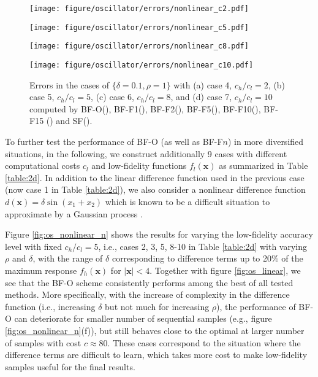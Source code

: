 \documentclass[11pt]{article}
\begin{document}
\begin{figure}
\centering
\begin{minipage}[b]{0.48\linewidth}
\texttt{[image: figure/oscillator/errors/nonlinear\_c2.pdf]}
\end{minipage}
\begin{minipage}[b]{0.48\linewidth}
\texttt{[image: figure/oscillator/errors/nonlinear\_c5.pdf]}
\end{minipage}
\begin{minipage}[b]{0.48\linewidth}
\texttt{[image: figure/oscillator/errors/nonlinear\_c8.pdf]}
\end{minipage}
\begin{minipage}[b]{0.48\linewidth}
\texttt{[image: figure/oscillator/errors/nonlinear\_c10.pdf]}
\end{minipage}
\caption{Errors in the cases of $\{\delta=0.1, \rho=1\}$ with (a) case 4, $c_h/c_l=2$, (b) case 5, $c_h/c_l=5$, (c) case 6, $c_h/c_l=8$, and (d) case 7, $c_h/c_l=10$ computed by BF-O(\blackline), BF-F1(\orangedashedline), BF-F2(\greendashedline), BF-F5(\reddashedline), BF-F10(\purpledashedline), BF-F15 (\browndashedline) and SF(\blueline).}
\label{fig:os_nonlinear_c}
\end{figure}


To further test the performance of BF-O (as well as BF-F$n$) in more diversified situations, in the following, we construct additionally 9 cases with different computational costs $c_l$ and low-fidelity functions $f_l(\mathbf{x})$ as summarized in Table \ref{table:2d}. In addition to the linear difference function used in the previous case (now case 1 in Table \ref{table:2d}), we also consider a nonlinear difference function $d(\mathbf{x})=\delta \sin(x_1 + x_2)$ which is known to be a difficult situation to approximate by a Gaussian process \cite{rasmussen2003gaussian}.

Figure \ref{fig:os_nonlinear_n} shows the results for varying the low-fidelity accuracy level with fixed $c_h/c_l=5$, i.e., cases 2, 3, 5, 8-10 in Table \ref{table:2d} with varying $\rho$ and $\delta$, with the range of $\delta$ corresponding to difference terms up to 20\% of the maximum response $f_h(\mathbf{x})$ for $|\mathbf{x}|<4$. Together with figure \ref{fig:os_linear}, we see that the BF-O scheme consistently performs among the best of all tested methods. More specifically, with the increase of complexity in the difference function (i.e., increasing $\delta$ but not much for increasing $\rho$), the performance of BF-O can deteriorate for smaller number of sequential samples (e.g., figure \ref{fig:os_nonlinear_n}(f)), but still behaves close to the optimal at larger number of samples with cost $c\approx 80$. These cases correspond to the situation where the difference terms are difficult to learn, which takes more cost to make low-fidelity samples useful for the final results. 
\end{document}
